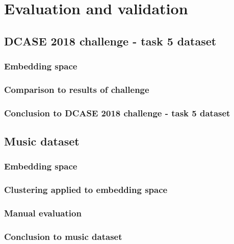 \chapter{Evaluation and validation}
\label{ch:Evalutation-Validation}

\section{DCASE 2018 challenge - task 5 dataset}
\label{sec:Results-DCASE}

\subsection{Embedding space}

\subsection{Comparison to results of challenge}

\subsection{Conclusion to DCASE 2018 challenge - task 5 dataset}

\section{Music dataset}
\label{sec:Results-Music}

\subsection{Embedding space}

\subsection{Clustering applied to embedding space}

\subsection{Manual evaluation}

\subsection{Conclusion to music dataset}

